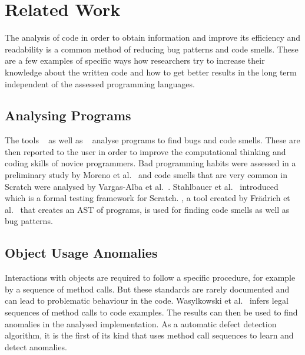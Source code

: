 \chapter{Related Work}\label{chap:related-work}
The analysis of code in order to obtain information and improve its efficiency and readability is a common method of reducing bug patterns and code smells. These are a few examples of specific ways how researchers try to increase their knowledge about the written code and how to get better results in the long term independent of the assessed programming languages. 

\section{Analysing \scratch{} Programs}\label{sec:analyzing-scratch}
The tools \drscratch{}~\cite{drscratch} as well as \hairball{}~\cite{hairball} analyse \scratch{} programs to find bugs and code smells. These are then reported to the user in order to improve the computational thinking and coding skills of novice programmers. Bad programming habits were assessed in a preliminary study by Moreno et al.~\cite{badhabits} and code smells that are very common in Scratch were analysed by Vargas-Alba et al.~\cite{badsmells}. Stahlbauer et al.~\cite{whisker} introduced \whisker{} which is a formal testing framework for Scratch. \litterbox, a tool created by Frädrich et al.~\cite{scratch_bugpatterns} that creates an AST of \scratch{} programs, is used for finding code smells as well as bug patterns.

\section{Object Usage Anomalies}
Interactions with objects are required to follow a specific procedure, for example by a sequence of method calls. But these standards are rarely documented and can lead to problematic behaviour in the code. Wasylkowski et al.~\cite{object_usage} infers legal sequences of method calls to code examples. The results can then be used to find anomalies in the analysed implementation. As a automatic defect detection algorithm, it is the first of its kind that uses method call sequences to learn and detect anomalies.

